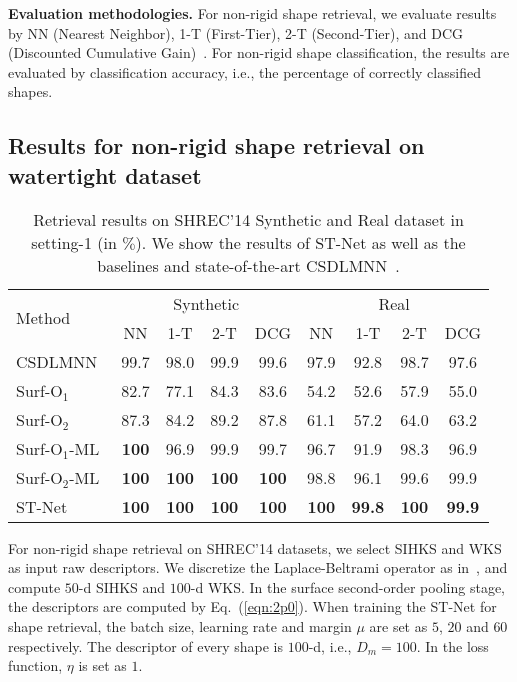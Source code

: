 \documentclass[runningheads]{llncs}
\begin{document}
\noindent
\textbf{Evaluation methodologies.} For  non-rigid shape retrieval, we evaluate results by NN (Nearest Neighbor), 1-T (First-Tier), 2-T (Second-Tier), and DCG (Discounted Cumulative Gain)~\cite{Philip}. For non-rigid shape classification, the results are evaluated by classification accuracy, i.e., the percentage of correctly classified shapes.

\subsection{Results for non-rigid shape retrieval on watertight dataset}
\begin{table*}[t]
\caption{Retrieval results on SHREC'14 Synthetic and Real dataset in setting-1 (in $\%$). We show the results of ST-Net as well as the baselines and state-of-the-art CSDLMNN~\cite{Ioannis}.}
\newcommand{\tabincell}[2]{\begin{tabular}{@{}#1@{}}#2\end{tabular}}
\begin{center}
\begin{tabular}{|l||  c c   c    c|| c   c  c c|}
\hline
\multirow{2}{*}{Method}              &\multicolumn{4}{c||}{Synthetic}                                &\multicolumn{4}{c|}{Real} \\
\cline{2-9}                         & NN        & 1-T          &  2-T          & DCG        & NN     & 1-T      &  2-T           & DCG\\
\hline
CSDLMNN~\cite{Ioannis}&99.7        &98.0         & 99.9      & 99.6       &97.9    &  92.8   &  98.7       &  97.6\\
Surf-O$_1$ &82.7  & 77.1 & 84.3 & 83.6     &54.2  & 52.6 & 57.9 & 55.0  \\   
Surf-O$_2$ &87.3  & 84.2 & 89.2 & 87.8     &61.1  & 57.2 & 64.0 &  63.2  \\   
Surf-O$_1$-ML &\textbf{100} & 96.9        &  99.9       & 99.7      &96.7   &  91.9   &  98.3       &  96.9\\
Surf-O$_2$-ML &\textbf{100} &\textbf{100}  &\textbf{100}   &\textbf{100} &98.8   &  96.1   &  99.6       &  99.9\\
ST-Net        &\textbf{100} &\textbf{100}  &\textbf{100}  &\textbf{100} &\textbf{100} &\textbf{99.8}  &\textbf{100} &\textbf{99.9}\\
\hline
\end{tabular}
\end{center}
\label{tab:tab1}
\end{table*}
For non-rigid shape retrieval on SHREC'14 datasets, we select SIHKS and WKS as input raw descriptors. We discretize the Laplace-Beltrami operator as in~\cite{Mathieu}, and compute $50$-d SIHKS and $100$-d WKS. In the surface second-order pooling stage, the descriptors are computed by  Eq.~(\ref{eqn:2p0}). When training the ST-Net for shape retrieval, the batch size, learning rate and margin $\mu$ are set as $5$, $20$ and $60$ respectively. The descriptor of every shape is $100$-d, i.e., $D_m = 100$.  In the loss function,  $\eta$ is set as $1$. 
\end{document}
